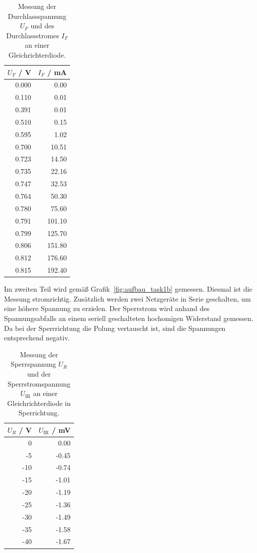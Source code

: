 \documentclass{article}
\newcommand{\UR}{$U_R$ }
\newcommand{\UIR}{$U_\text{IR}$ }
\begin{document}
\begin{table}[H]
\caption{Messung der Durchlassspannung $U_F$ und des Durchlassstromes $I_F$ an einer Gleichrichterdiode.}
\label{tab:task1a_daten}
\begin{tabular}{r|r}
$U_F$ / V & $I_F$ / mA \\ \hline
0.000 &  0.00   \\
0.110 &  0.01   \\
0.391 &  0.01   \\
0.510 &  0.15   \\
0.595 &  1.02   \\
0.700 & 10.51   \\
0.723 & 14.50   \\
0.735 & 22.16   \\
0.747 & 32.53   \\
0.764 & 50.30   \\
0.780 & 75.60   \\
0.791 & 101.10   \\
0.799 & 125.70   \\
0.806 & 151.80   \\
0.812 & 176.60   \\
0.815 & 192.40
\end{tabular}
\end{table}


Im zweiten Teil wird gemäß Grafik~\ref{fig:aufbau_task1b} gemessen. Diesmal ist die Messung stromrichtig. Zusätzlich werden zwei Netzgeräte in Serie geschalten, um eine höhere Spannung zu erzielen. Der Sperrstrom wird anhand des Spannungsabfalls an einem seriell geschalteten hochomigen Widerstand gemessen. Da bei der Sperrrichtung die Polung vertauscht ist, sind die Spannungen entsprechend negativ.



\begin{table}[H]
\caption{Messung der Sperrspannung \UR und der Sperrstromspannung  \UIR an einer Gleichrichterdiode in Sperrichtung.}
\label{tab:task1b_daten}
\begin{tabular}{r|r}
$U_R$ / V & $U_\text{IR}$ / mV \\ \hline
0   &  0.00 \\
-5  & -0.45 \\
-10 & -0.74 \\
-15 & -1.01 \\
-20 & -1.19 \\
-25 & -1.36 \\
-30 & -1.49 \\
-35 & -1.58 \\
-40 & -1.67
\end{tabular}
\end{table}
\end{document}
